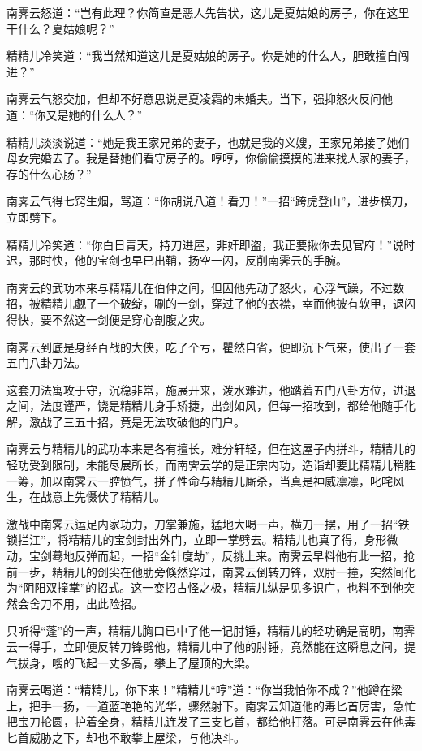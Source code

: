 \documentclass[12pt,oneside]{book}
\begin{document}
南霁云怒道：``岂有此理？你简直是恶人先告状，这儿是夏姑娘的房子，你在这里干什么？夏姑娘呢？''

精精儿冷笑道：``我当然知道这儿是夏姑娘的房子。你是她的什么人，胆敢擅自闯进？''

南霁云气怒交加，但却不好意思说是夏凌霜的未婚夫。当下，强抑怒火反问他道：``你又是她的什么人？''

精精儿淡淡说道：``她是我王家兄弟的妻子，也就是我的义嫂，王家兄弟接了她们母女完婚去了。我是替她们看守房子的。哼哼，你偷偷摸摸的进来找人家的妻子，存的什么心肠？''

南霁云气得七窍生烟，骂道：``你胡说八道！看刀！''一招``跨虎登山''，进步横刀，立即劈下。

精精儿冷笑道：``你白日青天，持刀进屋，非奸即盗，我正要揪你去见官府！''说时迟，那时快，他的宝剑也早已出鞘，扬空一闪，反削南霁云的手腕。

南霁云的武功本来与精精儿在伯仲之间，但因他先动了怒火，心浮气躁，不过数招，被精精儿觑了一个破绽，唰的一剑，穿过了他的衣襟，幸而他披有软甲，退闪得快，要不然这一剑便是穿心剖腹之灾。

南霁云到底是身经百战的大侠，吃了个亏，瞿然自省，便即沉下气来，使出了一套五门八卦刀法。

这套刀法寓攻于守，沉稳非常，施展开来，泼水难进，他踏着五门八卦方位，进退之间，法度谨严，饶是精精儿身手矫捷，出剑如风，但每一招攻到，都给他随手化解，激战了三五十招，竟是无法攻破他的门户。

南霁云与精精儿的武功本来是各有擅长，难分轩轻，但在这屋子内拼斗，精精儿的轻功受到限制，未能尽展所长，而南霁云学的是正宗内功，造诣却要比精精儿稍胜一筹，加以南霁云一腔愤气，拼了性命与精精儿厮杀，当真是神威凛凛，叱咤风生，在战意上先慑伏了精精儿。

激战中南霁云运足内家功力，刀掌兼施，猛地大喝一声，横刀一摆，用了一招``铁锁拦江''，将精精儿的宝剑封出外门，立即一掌劈去。精精儿也真了得，身形微动，宝剑蓦地反弹而起，一招``金针度劫''，反挑上来。南霁云早料他有此一招，抢前一步，精精儿的剑尖在他肋旁倏然穿过，南霁云倒转刀锋，双肘一撞，突然间化为``阴阳双撞掌''的招式。这一变招古怪之极，精精儿纵是见多识广，也料不到他突然会舍刀不用，出此险招。

只听得``蓬''的一声，精精儿胸口已中了他一记肘锤，精精儿的轻功确是高明，南霁云一得手，立即便反转刀锋劈他，精精儿中了他的肘锤，竟然能在这瞬息之间，提气拔身，嗖的飞起一丈多高，攀上了屋顶的大梁。

南霁云喝道：``精精儿，你下来！''精精儿``哼''道：``你当我怕你不成？''他蹲在梁上，把手一扬，一道蓝艳艳的光华，骤然射下。南霁云知道他的毒匕首厉害，急忙把宝刀抡圆，护着全身，精精儿连发了三支匕首，都给他打落。可是南霁云在他毒匕首威胁之下，却也不敢攀上屋梁，与他决斗。
\end{document}

